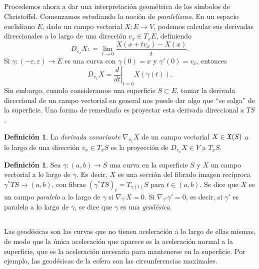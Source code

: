 \documentclass[11pt,a4paper]{amsbook}
\theoremstyle{remark} \newtheorem{rmk}[subsection]{Observación}
\theoremstyle{definition} \newtheorem{defn}[subsection]{Definición}
\theoremstyle{definition} \newtheorem{ex}[subsection]{Ejemplo}
\theoremstyle{definition} \newtheorem{ej}[subsection]{Ejercicio}
\begin{document}
\subsection{} Procedemos ahora a dar una interpretación geométrica de los símbolos de Christoffel. Comenzamos estudiando la noción de \emph{paralelismo}. En un espacio euclidiano $E$, dado un campo vectorial $X:E\rightarrow V$, podemos calcular sus derivadas direccionales a lo largo de una dirección $v_x \in T_xE$, definiendo
\begin{equation*}
D_{v_x} X : = \lim_{t\rightarrow 0} \frac{X(x+tv_x)-X(x)}{t}.
\end{equation*}
Si $\gamma:(-\varepsilon,\varepsilon)\rightarrow E$ es una curva con $\gamma(0)=x$ y $\gamma'(0)=v_x$, entonces
\begin{equation*}
D_{v_x} X = \left. \frac{d}{dt}\right|_{t=0} X(\gamma(t)).
\end{equation*}
Sin embargo, cuando consideramos una superficie $S\subset E$, tomar la derivada direccional de un campo vectorial en general nos puede dar algo que ``se salga'' de la superficie. Una forma de remediarlo es proyectar esta derivada direccional a $TS$.

\begin{defn}
La \emph{derivada covariante} $\nabla_{v_x}X$ de un campo vectorial $X\in \mathfrak X(S)$ a lo largo de una dirección $v_x\in T_xS$ es la proyección de $D_{v_x}X \in V$ a $T_xS$.
\end{defn}

\begin{defn}
Sea $\gamma:(a,b)\rightarrow S$ una curva en la superficie $S$ y $X$ un campo vectorial a lo largo de $\gamma$. Es decir, $X$ es una sección del fibrado imagen recíproca $\gamma^* TS \rightarrow (a,b)$, con fibras $(\gamma^* TS)_t = T_{\gamma(t)} S$ para $t\in (a,b)$. Se dice que $X$ es un campo \emph{paralelo} a lo largo de $\gamma$ si $\nabla_{\gamma'} X = 0$. Si $\nabla_{\gamma'} \gamma' = 0$, es decir, si $\gamma'$ es paralelo a lo largo de $\gamma$, se dice que $\gamma$ es una \emph{geodésica}.
\end{defn}

\subsection{} Las geodésicas son las curvas que no tienen aceleración a lo largo de ellas mismas, de modo que la única aceleración que aparece es la aceleración normal a la superficie, que es la aceleración necesaria para mantenerse en la superficie. Por ejemplo, las geodésicas de la esfera son las circunferencias maximales.
\end{document}
